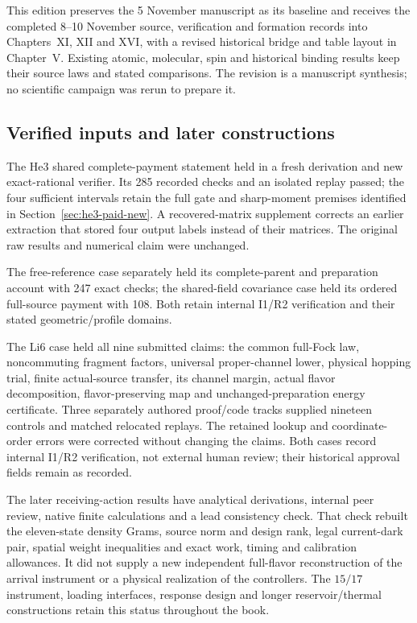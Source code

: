 \label{app:evidence-nov}

This edition preserves the 5 November manuscript as its baseline and
receives the completed 8--10 November source, verification and formation
records into Chapters~XI, XII and XVI, with a revised historical bridge
and table layout in Chapter~V. Existing atomic, molecular, spin and
historical binding results keep their source laws and stated comparisons.
The revision is a manuscript synthesis; no scientific campaign was rerun
to prepare it.

\subsection{Verified inputs and later constructions}

The He3 shared complete-payment statement held in a fresh derivation and
new exact-rational verifier. Its 285 recorded checks and an isolated replay
passed; the four sufficient intervals retain the full gate and sharp-moment
premises identified in Section~\ref{sec:he3-paid-new}. A recovered-matrix
supplement corrects an earlier extraction that stored four output labels
instead of their matrices. The original raw results and numerical claim
were unchanged.

The free-reference case separately held its complete-parent and
preparation account with 247 exact checks; the shared-field covariance
case held its ordered full-source payment with 108. Both retain internal
I1/R2 verification and their stated geometric/profile domains.

The Li6 case held all nine submitted claims: the common full-Fock law,
noncommuting fragment factors, universal proper-channel lower, physical
hopping trial, finite actual-source transfer, its channel margin, actual
flavor decomposition, flavor-preserving map and unchanged-preparation
energy certificate. Three separately authored proof/code tracks supplied
nineteen controls and matched relocated replays. The retained lookup and
coordinate-order errors were corrected without changing the claims. Both
cases record internal I1/R2 verification, not external human review; their
historical approval fields remain as recorded.

The later receiving-action results have analytical derivations, internal
peer review, native finite calculations and a lead consistency check.
That check rebuilt the eleven-state density Grams, source norm and design
rank, legal current-dark pair, spatial weight inequalities and exact work,
timing and calibration allowances. It did not supply a new independent
full-flavor reconstruction of the arrival instrument or a physical
realization of the controllers. The $15/17$ instrument, loading interfaces,
response design and longer reservoir/thermal constructions retain this
status throughout the book.

